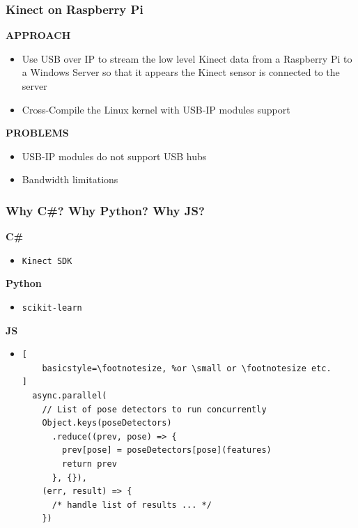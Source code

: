 \begin{frame}
\frametitle{Kinect on Raspberry Pi}

\textbf{APPROACH}

\begin{itemize}
\item Use USB over IP to stream the low level Kinect data from a Raspberry Pi 
to a Windows Server so that it appears the Kinect sensor is connected to the server
\item Cross-Compile the Linux kernel with USB-IP modules support
\end{itemize}

\textbf{PROBLEMS}

\begin{itemize}
\item USB-IP modules do not support USB hubs
\item Bandwidth limitations
\end{itemize}

\end{frame}

\begin{frame}[fragile]
\frametitle{Why C\#? Why Python? Why JS?}

\textbf{C\#}

\begin{itemize}
\item \texttt{Kinect SDK}
\end{itemize}

\textbf{Python}

\begin{itemize}
\item \texttt{scikit-learn}
\end{itemize}

\textbf{JS}
\begin{itemize}
\item 
\begin{lstlisting}[
    basicstyle=\footnotesize, %or \small or \footnotesize etc.
]
  async.parallel(
    // List of pose detectors to run concurrently
    Object.keys(poseDetectors)
      .reduce((prev, pose) => {
        prev[pose] = poseDetectors[pose](features)
        return prev
      }, {}),
    (err, result) => {
      /* handle list of results ... */
    })
\end{lstlisting}

\end{itemize}

\end{frame}

